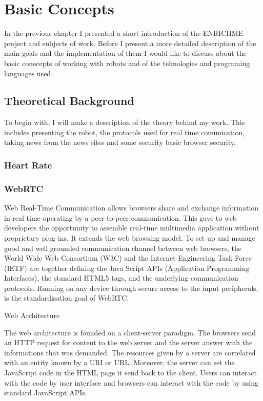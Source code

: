 \chapter{Basic Concepts}
\label{chapter:basic}
In the previous chapter I presented a short introduction of the ENRICHME project and subjects of work.
Before I present a more detailed description of the main goals and the implementation of them I would like
to discuss about the basic conecepts of working with robots and of the tehnologies and programing languages used.


\section{Theoretical Background}
\label{sec:tbkg}

To begin with, I will make a description of the theory behind my work. This includes
presenting the robot, the protocols used for real time comunication, taking news from the news sites
and some security basic browser security.

\subsection{Heart Rate}
\label{sub-sec:tbkg-heartrate}



\subsection{WebRTC}
\label{sub-sec:tbkg-webRTC}
	Web Real-Time Communication allows browsers share and exchange information in real time operating by a peer-to-peer communication. This gave to web developers the opportunity to 
assemble real-time multimedia application without proprietary plug-ins. It extends the web browsing model. To set up and manage good and well grounded communication channel between web browsers,  the World Wide Web Consortium (W3C) and the Internet Engineering Task Force (IETF) are together defining the Java Script APIs (Application Programming Interfaces), the standard HTML5 tags, and the underlying communication protocols. Running on any device through secure access to the input peripherals, is the standardisation goal of WebRTC. 

Web Architecture 

The web architecture is founded on a client-server paradigm. The browsers send an HTTP request for content to the web server and the server answer with the informations that was demanded. The resources given by a server are correlated with an entity known by a URI or URL. Moreover, the server can set the JavaScript code in the HTML page it send back to the client. Users can interact with the code by user interface and browsers can interact with the code by using standard JavaScript APIs. 

